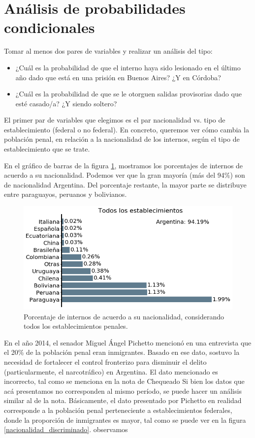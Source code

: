 \documentclass[10pt]{article}
\begin{document}
\section{Análisis de probabilidades condicionales}

Tomar al menos dos pares de variables y realizar un análisis del tipo:

\begin{itemize}
	\item ¿Cuál es la probabilidad de que el interno haya sido lesionado en el último año dado que está en una prisión en Buenos Aires? ¿Y en Córdoba?
	\item ¿Cuál es la probabilidad de que se le otorguen salidas provisorias dado que esté casado/a? ¿Y siendo soltero?
\end{itemize}

El primer par de variables que elegimos es el par nacionalidad vs. tipo de establecimiento (federal o no federal). En concreto, queremos ver c\'omo cambia la poblaci\'on penal, en relaci\'on a la nacionalidad de los internos, seg\'un el tipo de establecimiento que se trate. 

En el gr\'afico de barras de la figura \ref{fig:nacionalidad_todos}, mostramos los porcentajes de internos de acuerdo a su nacionalidad. Podemos ver que la gran mayor\'ia (m\'as del 94\%) son de nacionalidad Argentina. Del porcentaje restante, la mayor parte se distribuye entre paraguayos, peruanos y bolivianos.

\begin{figure}[H]
	\centering
\includegraphics[scale=0.40]{graficos/nacionalidad_bar.png}
	\caption{Porcentaje de internos de acuerdo a su nacionalidad, considerando todos los establecimientos penales.\label{fig:nacionalidad_todos}}
\end{figure}

En el a\~no 2014, el senador Miguel \'Angel Pichetto mencion\'o en una entrevista que el 20\% de la poblaci\'on penal eran inmigrantes. Basado en ese dato, sostuvo la necesidad de fortalecer el control fronterizo para disminuir el delito (particularmente, el narcotr\'afico) en Argentina. El dato mencionado es incorrecto, tal como se menciona en la nota de Chequeado \cite{chequeadoInmigrantes} Si bien los datos que ac\'a presentamos no corresponden al mismo per\'iodo, se puede hacer un an\'alisis similar al de la nota. B\'asicamente, el dato presentado por Pichetto en realidad corresponde a la poblaci\'on penal perteneciente a establecimientos federales, donde la proporci\'on de inmigrantes es mayor, tal como se puede ver en la figura \ref{nacionalidad_discriminado}. observamos 
\end{document}
